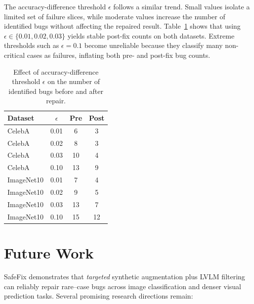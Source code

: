 \documentclass[10pt]{article} %
\newcommand{\model}{SafeFix\xspace}
\begin{document}
The accuracy-difference threshold $\epsilon$ follows a similar trend. Small values isolate a limited set of failure slices, while moderate values increase the number of identified bugs without affecting the repaired result. Table~\ref{tab:epsilon_threshold} shows that using \(\epsilon \in \{0.01, 0.02, 0.03\}\) yields stable post-fix counts on both datasets. Extreme thresholds such as $\epsilon=0.1$ become unreliable because they classify many non-critical cases as failures, inflating both pre- and post-fix bug counts.

\begin{table}[!t]
\centering
\small
\setlength{\tabcolsep}{6pt}
\renewcommand{\arraystretch}{0.95}
\caption{Effect of accuracy-difference threshold $\epsilon$ on the number of identified bugs before and after repair.}
\label{tab:epsilon_threshold}
\begin{tabular}{lccc}
\toprule
\textbf{Dataset} & \boldmath$\epsilon$ & \textbf{Pre} & \textbf{Post} \\
\midrule
CelebA      & 0.01 & 6  & 3 \\
CelebA      & 0.02 & 8  & 3 \\
CelebA      & 0.03 & 10 & 4 \\
CelebA      & 0.10 & 13 & 9 \\
ImageNet10  & 0.01 & 7  & 4 \\
ImageNet10  & 0.02 & 9  & 5 \\
ImageNet10  & 0.03 & 13 & 7 \\
ImageNet10  & 0.10 & 15 & 12 \\
\bottomrule
\end{tabular}
\end{table}


\section{Future Work}
\label{sec:future_work}

\model{} demonstrates that \emph{targeted} synthetic augmentation plus LVLM
filtering can reliably repair rare–case bugs across image classification and
denser visual prediction tasks.  
Several promising research directions remain:
\end{document}
